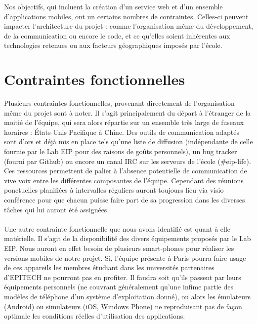 \documentclass{life-fr}
\begin{document}
Nos objectifs, qui incluent la création d'un service web et d'un ensemble d'applications mobiles, ont un certains nombres de contraintes. Celles-ci peuvent impacter l'architecture du projet : comme l'organisation même du développement, de la communication ou encore le code, et ce qu'elles soient inhérentes aux technologies retenues ou aux facteurs géographiques imposés par l'école.

\section{Contraintes fonctionnelles}

Plusieurs contraintes fonctionnelles, provenant directement de l'organisation même du projet sont à noter. Il s'agit principalement du départ à l'étranger de la moitié de l'équipe, qui sera alors répartie sur un ensemble très large de fuseaux horaires : États-Unis Pacifique à Chine. Des outils de communication adaptés sont d'ors et déjà mis en place tels qu'une liste de diffusion (indépendante de celle fournie par le Lab EIP pour des raisons de goûts personnels), un bug tracker (fourni par Github) ou encore un canal IRC sur les serveurs de l'école (\#eip-life). Ces ressources permettent de palier à l'absence potentielle de communication de vive voix entre les différentes composantes de l'équipe. Cependant des réunions ponctuelles planifiées à intervalles réguliers auront toujours lieu via visio conférence pour que chacun puisse faire part de sa progression dans les diverses tâches qui lui auront été assignées.\\
\\
Une autre contrainte fonctionnelle que nous avons identifié est quant à elle matérielle. Il s'agit de la disponibilité des divers équipements proposés par le Lab EIP. Nous auront en effet besoin de plusieurs smart-phones pour réaliser les versions mobiles de notre projet. Si, l'équipe présente à Paris pourra faire usage de ces appareils les membres étudiant dans les universités partenaires d'EPITECH ne pourront pas en profiter. Il faudra soit qu'ils passent par leurs équipements personnels (ne couvrant généralement qu'une infime partie des modèles de téléphone d'un système d'exploitation donné), ou alors les émulateurs (Android) ou simulateurs (iOS, Windows Phone) ne reproduisant pas de façon optimale les conditions réelles d'utilisation des applications.\\
\end{document}
